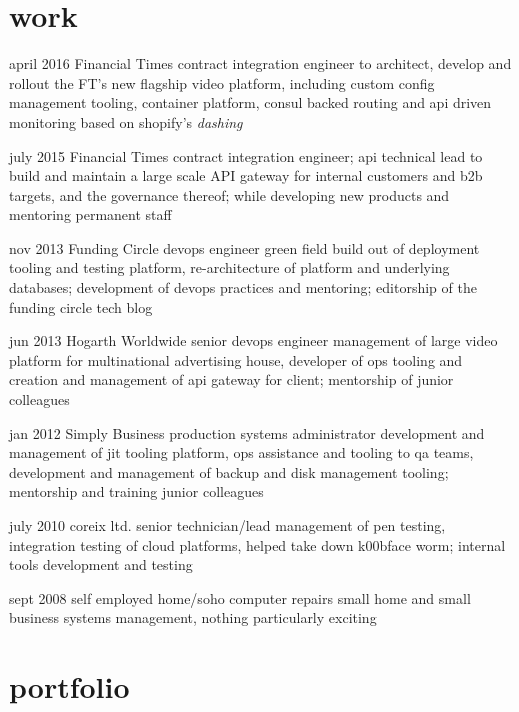 \documentclass[]{friggeri-cv}
\begin{document}
\section{work}

\begin{entrylist}

\entry
{april 2016}
{Financial Times}
{contract integration engineer}
{to architect, develop and rollout the FT's new flagship video platform, including custom config management tooling, container platform, consul backed routing and api driven monitoring based on shopify's \emph{dashing}}

\entry
{july 2015}
{Financial Times}
{contract integration engineer; api technical lead}
{to build and maintain a large scale API gateway for internal customers and b2b targets, and the governance thereof; while developing new products and mentoring permanent staff}

\entry
{nov 2013}
{Funding Circle}
{devops engineer}
{green field build out of deployment tooling and testing platform, re-architecture of platform and underlying databases; development of devops practices and mentoring; editorship of the funding circle tech blog}

\entry
{jun 2013}
{Hogarth Worldwide}
{senior devops engineer}
{management of large video platform for multinational advertising house, developer of ops tooling and creation and management of api gateway for client; mentorship of junior colleagues}

\entry
{jan 2012}
{Simply Business}
{production systems administrator}
{development and management of jit tooling platform, ops assistance and tooling to qa teams, development and management of backup and disk management tooling; mentorship and training junior colleagues}

\entry
{july 2010}
{coreix ltd.}
{senior technician/lead}
{management of pen testing, integration testing of cloud platforms, helped take down k00bface worm; internal tools development and testing}

\entry
{sept 2008}
{self employed}
{home/soho computer repairs}
{small home and small business systems management, nothing particularly exciting}


\end{entrylist}

\section{portfolio}
\end{document}
